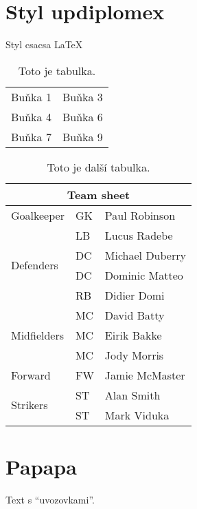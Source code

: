 \documentclass[a4paper,12pt]{article}
\begin{document}
\upmaketitle								%
\upthanksanot								%
\uptocandlists								%

\section{Styl updiplomex}
Styl csacsa \cpp \csharp \LaTeX

\begin{table}[ht]
  \begin{center}
    \begin{tabular}{||l|r||}
      Buňka 1 & Buňka 3 \\
      Buňka 4 & Buňka 6 \\
      Buňka 7 & Buňka 9 \\
      \hline
    \end{tabular}
    \caption{Toto je tabulka.}
  \end{center}
\end{table}
\begin{table}
\begin{center}
\begin{tabular}{|l|l|l|}
\hline
\multicolumn{3}{|c|}{Team sheet} \\
\hline
 Goalkeeper & GK & Paul Robinson \\ \hline
\multirow{4}{*}{Defenders} & LB & Lucus Radebe \\
  & DC & Michael Duberry \\
  & DC & Dominic Matteo \\
  & RB & Didier Domi \\ \hline
\multirow{3}{*}{Midfielders} & MC & David Batty \\
  & MC & Eirik Bakke \\
  & MC & Jody Morris \\ \hline
 Forward & FW & Jamie McMaster \\ \hline
\multirow{2}{*}{Strikers} & ST & Alan Smith \\
  & ST & Mark Viduka \\
\hline
\end{tabular}
\caption{Toto je další tabulka.}
\end{center}
\end{table}

\section{Papapa}
Text s \enquote{uvozovkami}.
\end{document}
